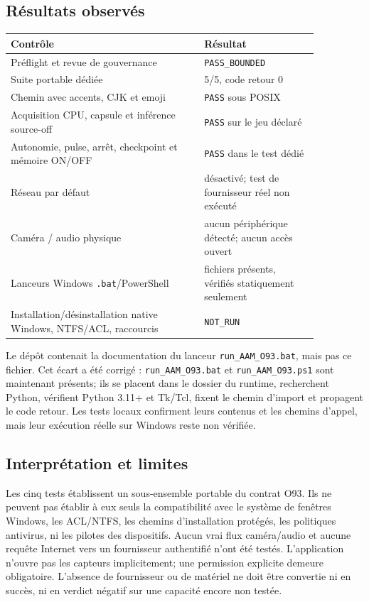 \documentclass[11pt,a4paper,oneside]{report}
\begin{document}
\subsection*{Résultats observés}
\begin{center}\small
\begin{tabular}{p{0.54\linewidth}p{0.32\linewidth}}
\toprule
Contrôle & Résultat \\
\midrule
Préflight et revue de gouvernance & \texttt{PASS\_BOUNDED} \\
Suite portable dédiée & 5/5, code retour 0 \\
Chemin avec accents, CJK et emoji & \texttt{PASS} sous POSIX \\
Acquisition CPU, capsule et inférence source-off & \texttt{PASS} sur le jeu déclaré \\
Autonomie, pulse, arrêt, checkpoint et mémoire ON/OFF & \texttt{PASS} dans le test dédié \\
Réseau par défaut & désactivé; test de fournisseur réel non exécuté \\
Caméra / audio physique & aucun périphérique détecté; aucun accès ouvert \\
Lanceurs Windows \texttt{.bat}/PowerShell & fichiers présents, vérifiés statiquement seulement \\
Installation/désinstallation native Windows, NTFS/ACL, raccourcis & \texttt{NOT\_RUN} \\
\bottomrule
\end{tabular}
\end{center}

Le dépôt contenait la documentation du lanceur \texttt{run\_AAM\_O93.bat}, mais pas ce fichier. Cet écart a été corrigé : \texttt{run\_AAM\_O93.bat} et \texttt{run\_AAM\_O93.ps1} sont maintenant présents; ils se placent dans le dossier du runtime, recherchent Python, vérifient Python 3.11+ et Tk/Tcl, fixent le chemin d'import et propagent le code retour. Les tests locaux confirment leurs contenus et les chemins d'appel, mais leur exécution réelle sur Windows reste non vérifiée.

\subsection*{Interprétation et limites}
Les cinq tests établissent un sous-ensemble portable du contrat O93. Ils ne peuvent pas établir à eux seuls la compatibilité avec le système de fenêtres Windows, les ACL/NTFS, les chemins d'installation protégés, les politiques antivirus, ni les pilotes des dispositifs. Aucun vrai flux caméra/audio et aucune requête Internet vers un fournisseur authentifié n'ont été testés. L'application n'ouvre pas les capteurs implicitement; une permission explicite demeure obligatoire. L'absence de fournisseur ou de matériel ne doit être convertie ni en succès, ni en verdict négatif sur une capacité encore non testée.
\end{document}
